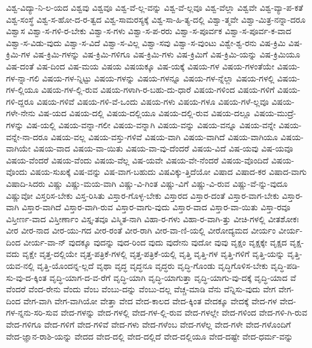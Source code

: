 {ವಿಶ್ವ-ವಿದ್ಯಾ-ನಿ-ಲ-ಯದ
ವಿಶ್ವವು
ವಿಶ್ವವೂ
ವಿಶ್ವ-ವೆ-ಲ್ಲ-ವನ್ನು
ವಿಶ್ವ-ವೆ-ಲ್ಲವೂ
ವಿಶ್ವ-ವೆಲ್ಲಾ
ವಿಶ್ವವೇ
ವಿಶ್ವ-ವ್ಯಾ-ಪ-ಕತೆ
ವಿಶ್ವ-ಸಂಸ್ಥೆ
ವಿಶ್ವ-ಸ-ಹೋ-ದ-ರ-ತ್ವದ
ವಿಶ್ವ-ಸಾಮರಸ್ಯಕ್ಕೆ
ವಿಶ್ವ-ಸಾ-ಹಿ-ತ್ಯ-ದಲ್ಲಿ
ವಿಶ್ವಾ-ತ್ಮವೇ
ವಿಶ್ವಾ-ಮಿತ್ರ-ನನ್ನಾ-ದರೂ
ವಿಶ್ವಾಸ
ವಿಶ್ವಾ-ಸ-ಗಳಿ-ರ-ಬೇಕು
ವಿಶ್ವಾ-ಸ-ಗಳು
ವಿಶ್ವಾ-ಸ-ಪ-ರರು
ವಿಶ್ವಾ-ಸ-ಪೂರ್ವಕ
ವಿಶ್ವಾ-ಸ-ಪೂರ್ವ-ಕ-ವಾದ
ವಿಶ್ವಾ-ಸ-ವಿಡು-ವುದು
ವಿಶ್ವಾ-ಸ-ವಿದೆ
ವಿಶ್ವಾ-ಸ-ವಿಲ್ಲ
ವಿಶ್ವಾ-ಸವು
ವಿಶ್ವಾ-ಸ-ವುಂಟು
ವಿಶ್ವೇ-ಶ್ವ-ರನು
ವಿಷ-ಕ್ರಿಮಿ
ವಿಷ-ಕ್ರಿಮಿ-ಗಳ
ವಿಷ-ಕ್ರಿಮಿ-ಗಳನ್ನು
ವಿಷ-ಕ್ರಿಮಿ-ಗಳಿಗೂ
ವಿಷ-ಕ್ರಿಮಿ-ಗಳು
ವಿಷ-ಕ್ರಿಮಿಗೆ
ವಿಷ-ಕ್ರಿಮಿ-ಯನ್ನು
ವಿಷ-ಕ್ರಿಮಿಯೂ
ವಿಷ-ದಂತೆ
ವಿಷ-ದಿಂದ
ವಿಷ-ಮಯ
ವಿಷಯ
ವಿಷಯಕ್ಕೂ
ವಿಷ-ಯಕ್ಕೆ
ವಿಷಯ-ಗಳ
ವಿಷಯ-ಗಳಂತೆಯೇ
ವಿಷಯ-ಗಳ-ನ್ನಾ-ಗಲಿ
ವಿಷಯ-ಗಳ-ನ್ನಿಟ್ಟು
ವಿಷಯ-ಗಳನ್ನು
ವಿಷಯ-ಗಳನ್ನೂ
ವಿಷಯ-ಗಳ-ನ್ನೆಲ್ಲಾ
ವಿಷಯ-ಗಳಲ್ಲಿ
ವಿಷಯ-ಗಳ-ಲ್ಲಿಯೂ
ವಿಷಯ-ಗಳ-ಲ್ಲಿ-ರುವ
ವಿಷಯ-ಗಳಾಗಿ-ರ-ಬಹು-ದು-ಧಾರೆ
ವಿಷಯ-ಗಳಿಂದ
ವಿಷಯ-ಗಳಿಗೆ
ವಿಷಯ-ಗಳಿ-ದ್ದರೂ
ವಿಷಯ-ಗಳಿವೆ
ವಿಷಯ-ಗಳಿ-ವೆ-ಒಂದು
ವಿಷಯ-ಗಳು
ವಿಷಯ-ಗಳೂ
ವಿಷಯ-ಗಳೆ-ಲ್ಲವೂ
ವಿಷಯ-ಗಳೇ-ನೇನು
ವಿಷ-ಯದ
ವಿಷಯ-ದಲ್ಲಿ
ವಿಷಯ-ದಲ್ಲಿಯೂ
ವಿಷಯ-ದಲ್ಲಿ-ರುವ
ವಿಷಯ-ದಲ್ಲೂ
ವಿಷಯ-ಮುದ್ರೆ-ಗಳನ್ನು
ವಿಷ-ಯಲ್ಲಿ
ವಿಷಯ-ವನ್ನಾ-ಗಲೀ
ವಿಷಯ-ವನ್ನಾಗಿ
ವಿಷಯ-ವನ್ನು
ವಿಷಯ-ವನ್ನೂ
ವಿಷಯ-ವನ್ನೇ
ವಿಷಯ-ವನ್ನೇ-ನಾ-ದರೂ
ವಿಷಯ-ವಲ್ಲ
ವಿಷಯ-ವಸ್ತು-ಗಳಿವೆ
ವಿಷಯ-ವಾಗಿ
ವಿಷಯ-ವಾಗಿದೆ
ವಿಷಯ-ವಾಗಿಯೂ
ವಿಷಯ-ವಾಗಿಯೇ
ವಿಷಯ-ವಾದ
ವಿಷಯ-ವಾ-ಯಿತು
ವಿಷಯ-ವಾ-ವು-ದೆಂದರೆ
ವಿಷಯ-ವಿದೆ
ವಿಷ-ಯವು
ವಿಷ-ಯವೂ
ವಿಷಯ-ವೆಂದರೆ
ವಿಷಯ-ವೆಂದು
ವಿಷಯ-ವೆಲ್ಲ
ವಿಷ-ಯವೇ
ವಿಷಯ-ವೇ-ನೆಂದರೆ
ವಿಷಯ-ವೊಂದಿದೆ
ವಿಷಯ-ವೊಂದು
ವಿಷಯ-ಸುಖಕ್ಕೆ
ವಿಷ-ವನ್ನು
ವಿಷ-ವಾಗ-ಬಹುದು
ವಿಷವಿಕ್ಕು-ತ್ತಿದೆಯೋ
ವಿಷಾದ
ವಿಷಾದ-ಕರ
ವಿಷಾದ-ವಾಗು
ವಿಷಾದಿ-ಸಿದರು
ವಿಷ್ಣು
ವಿಷ್ಣು-ಮಯ-ವಾಗಿ
ವಿಷ್ಣು-ವಿ-ಗಿಂತ
ವಿಷ್ಣು-ವಿಗೆ
ವಿಷ್ಣು-ವಿ-ರುವ
ವಿಷ್ಣು-ವೆ-ನ್ನು-ವುದೂ
ವಿಷ್ಣುವೋ
ವಿಸ್ತರಿಸ-ಬೇಕು
ವಿಸ್ತ-ರಿಸಿತು
ವಿಸ್ತಾರ-ಗೊಳ್ಳ-ಬೇಕು
ವಿಸ್ತಾರದ
ವಿಸ್ತಾರ-ದಂತೆ
ವಿಸ್ತಾರ-ವಾಗ-ಬೇಕು
ವಿಸ್ತಾರ-ವಾಗಿ
ವಿಸ್ತಾರ-ವಾಗಿದೆ
ವಿಸ್ತಾರ-ವಾಗಿ-ರುವ
ವಿಸ್ತಾರ-ವಾಗು-ವುದು
ವಿಸ್ತಾರ-ವಾದ
ವಿಸ್ತಾರ-ವಾ-ಯಿತು
ವಿಸ್ತಾ-ರವೂ
ವಿಸ್ತೀರ್ಣ-ವಾದ
ವಿಸ್ತೀರ್ಣಾಂ
ವಿಸ್ತೃ-ತವೂ
ವಿಸ್ಮಿತ-ನಾಗಿ
ವಿಹಾ-ರ-ಗಳು
ವಿಹಾ-ರ-ವಾಗಿ-ತ್ತು
ವೀಚಿ-ಗಳಲ್ಲಿ
ವೀತಶೋಕಃ
ವೀರ
ವೀರ-ನಾದ
ವೀರ-ಯು-ಗದ
ವೀರ-ರಂತೆ
ವೀರ-ರಾಗಿ
ವೀರ-ವಾ-ಣಿ-ಯಲ್ಲಿ
ವೀರೋದ್ಯಮದ
ವೀರ್ಯಂ
ವೀರ್ಯ-ದಿಂದ
ವೀರ್ಯ-ವಾ-ನ್
ವುದಕ್ಕೂ
ವುದನ್ನು
ವುದ-ರಿಂದ
ವುದು
ವುದೇನು
ವುದೋ
ವುವು
ವೃಕ್ಷಂ
ವೃಕ್ಷಕ್ಕೇ
ವೃಕ್ಷದ
ವೃಕ್ಷ-ವದು
ವೃಕ್ಷೇ
ವೃತ್ತ-ದಲ್ಲಿಯೇ
ವೃತ್ತ-ಪತ್ರಿಕೆ-ಗಳಲ್ಲಿ
ವೃತ್ತ-ಪತ್ರಿಕೆ-ಯಲ್ಲಿ
ವೃತ್ತಿ
ವೃತ್ತಿ-ಗಳ
ವೃತ್ತಿ-ಗಳಿಗೆ
ವೃತ್ತಿ-ಯನ್ನು
ವೃತ್ತಿ-ಯವ-ನಲ್ಲಿ
ವೃತ್ತಿ-ಯೊಂದನ್ನ-ಲ್ಲದೆ
ವೃಥಾ
ವೃದ್ಧ
ವೃದ್ಧನೂ
ವೃದ್ಧರು
ವೃದ್ಧಿ-ಗೊಂಡು
ವೃದ್ಧಿಗೊಳಿಸ-ಬೇಕು
ವೃದ್ಧಿ-ಪಡಿ-ಸು-ವು-ದ-ಕ್ಕಿಂತ
ವೃದ್ಧಿ-ಯಾಗ-ದ-ವ-ರೆಗೆ
ವೃದ್ಧಿ-ಯಾಗಿ
ವೃದ್ಧಿ-ಯಾಗುತ್ತಾ
ವೃದ್ಧಿ-ಯಾಗು-ವು-ದಕ್ಕೆ
ವೃದ್ಧಿ-ಯಾದ
ವೆ
ವೆಂದರೆ
ವೆಂದ-ರೇನು
ವೆಂದು
ವೆಂಬ
ವೆಂಬು-ದನ್ನು
ವೆಂಬು-ದಲ್ಲ
ವೆಚ್ಚ-ಮಾಡಿ
ವೆನು
ವೆನ್ನಿಸು-ವುದು
ವೇಗ
ವೇಗ-ದಿಂದ
ವೇಗ-ವಾಗಿ
ವೇಗ-ವಾಗಿಯೋ
ವೇತ್ತಾ
ವೇದ
ವೇದ-ಕಾಲದ
ವೇದ-ಕ್ಕಿಂತ
ವೇದಕ್ಕೂ
ವೇದಕ್ಕೆ
ವೇದ-ಗಳ
ವೇದ-ಗಳ-ನ್ನನು-ಸರಿ-ಸುವ
ವೇದ-ಗಳನ್ನು
ವೇದ-ಗಳಲ್ಲಿ
ವೇದ-ಗಳ-ಲ್ಲಿ-ರುವ
ವೇದ-ಗಳಲ್ಲೇ
ವೇದ-ಗಳಿಂದ
ವೇದ-ಗಳಿ-ಗಿ-ರುವ
ವೇದ-ಗಳಿಗೂ
ವೇದ-ಗಳಿಗೆ
ವೇದ-ಗಳಿವೆ
ವೇದ-ಗಳು
ವೇದ-ಗಳೆಂಬ
ವೇದ-ಗಳೆಲ್ಲ
ವೇದ-ಗಳೇ
ವೇದ-ಗಳೊಂದಿಗೆ
ವೇದ-ಜ್ಞಾನ-ರಾಶಿ-ಯನ್ನು
ವೇದದ
ವೇದ-ದಲ್ಲಿ
ವೇದ-ದಲ್ಲಿದೆ
ವೇದ-ದಲ್ಲಿಯೂ
ವೇದ-ದಷ್ಟೇ
ವೇದ-ಧರ್ಮ-ವನ್ನು
}
